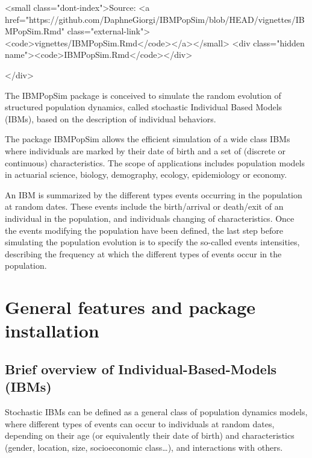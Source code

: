       
      <small class="dont-index">Source: <a href="https://github.com/DaphneGiorgi/IBMPopSim/blob/HEAD/vignettes/IBMPopSim.Rmd" class="external-link"><code>vignettes/IBMPopSim.Rmd</code></a></small>
      <div class="hidden name"><code>IBMPopSim.Rmd</code></div>

    </div>

    
    
The IBMPopSim package is conceived to simulate the random evolution of structured population dynamics, called stochastic Individual Based Models (IBMs), based on the description of individual behaviors.

The package IBMPopSim allows the efficient simulation of a wide class IBMs where individuals are marked by their date of birth and a set of (discrete or continuous) characteristics. The scope of applications includes population models in actuarial science, biology, demography, ecology, epidemiology or economy.

An IBM is summarized by the different types events occurring in the population at random dates. These events include the birth/arrival or death/exit of an individual in the population, and individuals changing of characteristics.
Once the events modifying the population have been defined, the last step before simulating the population evolution is to specify the so-called events intensities, describing the frequency at which the different types of events occur in the population.

\hypertarget{general-features-and-package-installation}{%
\section{General features and package installation}\label{general-features-and-package-installation}}

\hypertarget{brief-overview-of-individual-based-models-ibms}{%
\subsection{Brief overview of Individual-Based-Models (IBMs)}\label{brief-overview-of-individual-based-models-ibms}}

Stochastic IBMs can be defined as a general class of population dynamics models, where different types of events can occur to individuals at random dates, depending on their age (or equivalently their date of birth) and characteristics (gender, location, size, socioeconomic class\ldots), and interactions with others.

